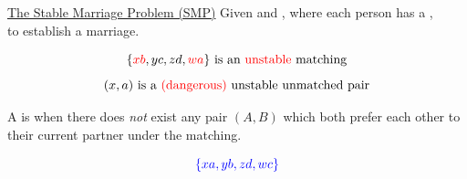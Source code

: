 
\begin{frame}
  \begin{exampleblock}{
      \href{https://youtu.be/Qcv1IqHWAzg}{The Stable Marriage Problem (SMP)}}
    Given  and ,
    where each person has a , \\
    to establish a  marriage.
  \end{exampleblock}


  \pause
  \vspace{-0.30cm}
  \[
    \{\textcolor{red}{xb}, yc, zd, \textcolor{red}{wa}\} \text{ is an \textcolor{red}{unstable} matching}
  \]
  \[
    (x, a) \text{ is a \textcolor{red}{(dangerous)} unstable unmatched pair}
  \]

  \pause
  \begin{definition}
    A  is 
    when there does {\it not} exist any pair $(A, B)$
    which both prefer each other to their current partner
    under the matching.
  \end{definition}
\end{frame}

\begin{frame}
  \begin{center}
  \end{center}
\end{frame}

\begin{frame}{}
  \[
    \textcolor{blue}{\{xa, yb, zd, wc\}}
  \]


  \begin{theorem}
     
      \\
  \end{theorem}

  \pause
\end{frame}

\begin{frame}{}
  \begin{center}

  \end{center}
\end{frame}
